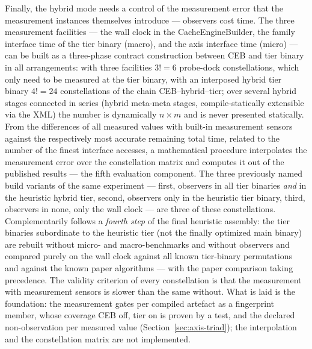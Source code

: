 \begin{nurlang}
Finally, the hybrid mode needs a control of the measurement error that the measurement instances themselves
introduce --- observers cost time. The three measurement facilities --- the wall clock in the
CacheEngineBuilder, the family interface time of the tier binary (macro), and the axis interface time
(micro) --- can be built as a three-phase contract construction between CEB and tier binary in all
arrangements: with three facilities $3! = 6$ probe-dock constellations, which only need to be measured at the tier binary,
with an interposed hybrid tier binary $4! = 24$ constellations of the chain
CEB--hybrid--tier; over several hybrid stages connected in series (hybrid meta-meta stages,
compile-statically extensible via the XML) the number is dynamically $n \times m$ and is never presented
statically. From the differences of all measured values with built-in measurement sensors against the respectively most accurate
remaining total time, related to the number of the finest interface accesses, a
mathematical procedure interpolates the measurement error over the constellation matrix and computes it out of the
published results --- the fifth evaluation component. The three previously named
build variants of the same experiment --- first, observers in all tier binaries \emph{and} in the
heuristic hybrid tier, second, observers only in the heuristic tier binary, third, observers in none,
only the wall clock --- are three of these constellations. Complementarily follows a \emph{fourth step}
of the final heuristic assembly: the tier binaries subordinate to the heuristic tier (not the
finally optimized main binary) are rebuilt without micro- and macro-benchmarks and without observers and
compared purely on the wall clock against all known tier-binary permutations and against the known
paper algorithms --- with the paper comparison taking precedence. The validity criterion of every
constellation is that the measurement with measurement sensors is slower than the same without. What is laid is the
foundation: the measurement gates per compiled artefact as a fingerprint member, whose coverage CEB off, tier on is proven by a test,
and the declared non-observation per measured value (Section~\ref{sec:axis-triad}); the
interpolation and the constellation matrix are not implemented.


\end{nurlang}
